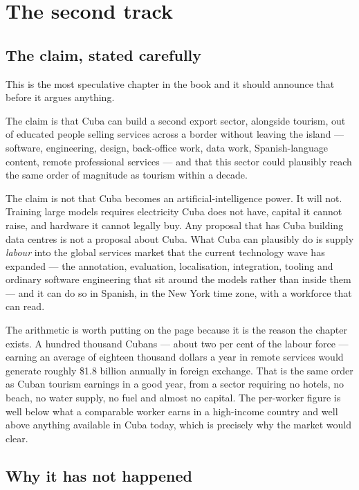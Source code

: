 \chapter{The second track}
\label{ch:talent}

\section{The claim, stated carefully}

This is the most speculative chapter in the book and it should announce that
before it argues anything.

The claim is that Cuba can build a second export sector, alongside tourism, out
of educated people selling services across a border without leaving the island
--- software, engineering, design, back-office work, data work, Spanish-language
content, remote professional services --- and that this sector could plausibly
reach the same order of magnitude as tourism within a decade.

The claim is not that Cuba becomes an artificial-intelligence power. It will not.
Training large models requires electricity Cuba does not have, capital it cannot
raise, and hardware it cannot legally buy. Any proposal that has Cuba building
data centres is not a proposal about Cuba. What Cuba can plausibly do is supply
\emph{labour} into the global services market that the current technology wave
has expanded --- the annotation, evaluation, localisation, integration, tooling
and ordinary software engineering that sit around the models rather than inside
them --- and it can do so in Spanish, in the New York time zone, with a
workforce that can read.

The arithmetic is worth putting on the page because it is the reason the chapter
exists. A hundred thousand Cubans --- about two per cent of the labour force ---
earning an average of eighteen thousand dollars a year in remote services would
generate roughly \$1.8 billion annually in foreign exchange.\unv{} That is the
same order as Cuban tourism earnings in a good year, from a sector requiring no
hotels, no beach, no water supply, no fuel and almost no capital. The per-worker
figure is well below what a comparable worker earns in a high-income country and
well above anything available in Cuba today, which is precisely why the market
would clear.

\section{Why it has not happened}

